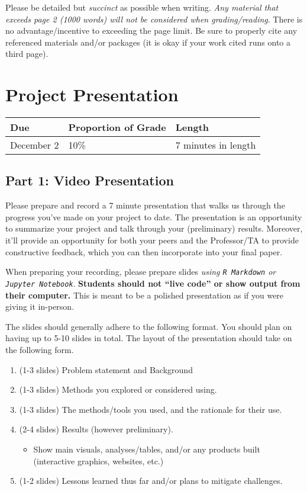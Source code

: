 \documentclass[
  12pt,
]{article}
\providecommand{\tightlist}{%
  \setlength{\itemsep}{0pt}\setlength{\parskip}{0pt}}
\begin{document}
Please be detailed but \emph{succinct} as possible when writing.
\emph{Any material that exceeds page 2 (1000 words) will not be
considered when grading/reading}. There is no advantage/incentive to
exceeding the page limit. Be sure to properly cite any referenced
materials and/or packages (it is okay if your work cited runs onto a
third page).

\hypertarget{project-presentation}{%
\section{Project Presentation}\label{project-presentation}}

\begin{longtable}[]{@{}lll@{}}
\toprule
\textbf{Due} & \textbf{Proportion of Grade} &
\textbf{Length}\tabularnewline
\midrule
\endhead
December 2 & 10\% & 7 minutes in length\tabularnewline
\bottomrule
\end{longtable}

\hypertarget{part-1-video-presentation}{%
\subsection{Part 1: Video
Presentation}\label{part-1-video-presentation}}

Please prepare and record a 7 minute presentation that walks us through
the progress you've made on your project to date. The presentation is an
opportunity to summarize your project and talk through your
(preliminary) results. Moreover, it'll provide an opportunity for both
your peers and the Professor/TA to provide constructive feedback, which
you can then incorporate into your final paper.

When preparing your recording, please prepare slides \emph{using
\texttt{R\ Markdown} or \texttt{Jupyter\ Notebook}}. \textbf{Students
should not ``live code'' or show output from their computer.} This is
meant to be a polished presentation as if you were giving it in-person.

The slides should generally adhere to the following format. You should
plan on having up to 5-10 slides in total. The layout of the
presentation should take on the following form.

\begin{enumerate}
\def\labelenumi{\arabic{enumi}.}
\item
  (1-3 slides) Problem statement and Background
\item
  (1-3 slides) Methods you explored or considered using.
\item
  (1-3 slides) The methods/tools you used, and the rationale for their
  use.
\item
  (2-4 slides) Results (however preliminary).

  \begin{itemize}
  \tightlist
  \item
    Show main visuals, analyses/tables, and/or any products built
    (interactive graphics, websites, etc.)
  \end{itemize}
\item
  (1-2 slides) Lessons learned thus far and/or plans to mitigate
  challenges.
\end{enumerate}
\end{document}
